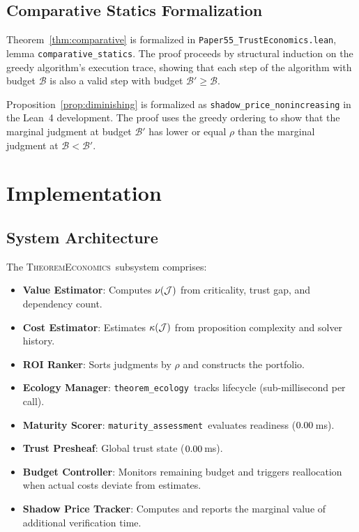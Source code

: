 \documentclass[11pt]{article}
\newcommand{\TheoremEcon}{\textsc{TheoremEconomics}}
\newcommand{\VerifBudget}{\mathcal{B}}
\newcommand{\TrustValue}{\nu}
\newcommand{\VerifCost}{\kappa}
\newcommand{\TrustReturn}{\rho}
\newcommand{\ThmEcol}{\texttt{theorem\_ecology}}
\newcommand{\MatAssess}{\texttt{maturity\_assessment}}
\begin{document}
\subsection{Comparative Statics Formalization}

\begin{lemma}\label{lem:comp-stat-formal}
Theorem~\ref{thm:comparative} is formalized in
\texttt{Paper55\_TrustEconomics.lean}, lemma
\texttt{comparative\_statics}.  The proof proceeds by structural
induction on the greedy algorithm's execution trace, showing that
each step of the algorithm with budget $\VerifBudget$ is also a valid
step with budget $\VerifBudget' \geq \VerifBudget$.
\end{lemma}

\begin{lemma}\label{lem:dim-formal}
Proposition~\ref{prop:diminishing} is formalized as
\texttt{shadow\_price\_nonincreasing} in the Lean~4 development.
The proof uses the greedy ordering to show that the marginal
judgment at budget $\VerifBudget'$ has lower or equal $\TrustReturn$
than the marginal judgment at $\VerifBudget < \VerifBudget'$.
\end{lemma}

\section{Implementation}\label{sec:implementation}

\subsection{System Architecture}
The \TheoremEcon\ subsystem comprises:
\begin{itemize}[noitemsep]
  \item \textbf{Value Estimator}: Computes $\TrustValue(\J)$ from
        criticality, trust gap, and dependency count.
  \item \textbf{Cost Estimator}: Estimates $\VerifCost(\J)$ from
        proposition complexity and solver history.
  \item \textbf{ROI Ranker}: Sorts judgments by $\TrustReturn$ and
        constructs the portfolio.
  \item \textbf{Ecology Manager}: \ThmEcol\ tracks lifecycle
        (sub-millisecond per call).
  \item \textbf{Maturity Scorer}: \MatAssess\ evaluates readiness
        ($0.00$\,ms).
  \item \textbf{Trust Presheaf}: Global trust state
        ($0.00$\,ms).
  \item \textbf{Budget Controller}: Monitors remaining budget and
        triggers reallocation when actual costs deviate from estimates.
  \item \textbf{Shadow Price Tracker}: Computes and reports the
        marginal value of additional verification time.
\end{itemize}
\end{document}
